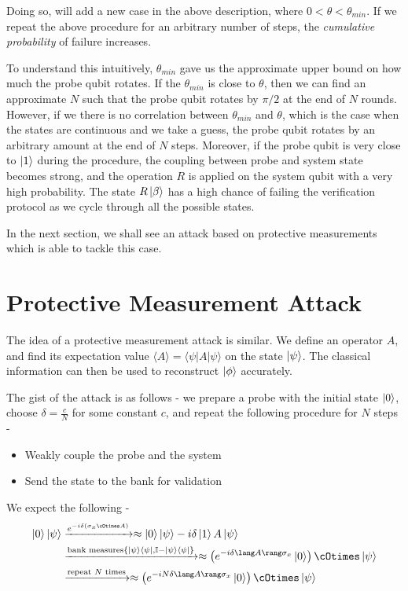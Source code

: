 \documentclass[]{article}
\newcommand*{\E}[1]{\langle #1 \rangle}
\begin{document}
Doing so, will add a new case in the above description, where $0 < \theta < \theta_{min}$. If we repeat the above procedure for an arbitrary number of steps, the \textit{cumulative probability} of failure increases. 

To understand this intuitively, $\theta_{min}$ gave us the approximate upper bound on how much the probe qubit rotates. If the $\theta_{min}$ is close to $\theta$, then we can find an approximate $N$ such that the probe qubit rotates by $\pi/2$ at the end of $N$ rounds. However, if we there is no correlation between $\theta_{min}$ and $\theta$, which is the case when the states are continuous and we take a guess, the probe qubit rotates by an arbitrary amount at the end of $N$ steps. Moreover, if the probe qubit is very close to $\ket{1}$ during the procedure, the coupling between probe and system state becomes strong, and the operation $R$ is applied on the system qubit with a very high probability. The state $R\ket{\beta}$ has a high chance of failing the verification protocol as we cycle through all the possible states.

In the next section, we shall see an attack based on protective measurements which is able to tackle this case.
\clearpage
\section{Protective Measurement Attack}
The idea of a protective measurement attack is similar. We define an operator $A$, and find its expectation value $\E{A} = \langle \psi \vert A \vert \psi \rangle$ on the state $\ket{\psi}$. The classical information can then be used to reconstruct $\ket{\phi}$ accurately.

The gist of the attack is as follows - we prepare a probe with the initial state $\ket{0}$, choose $\delta = \frac{c}{N}$ for some constant $c$, and repeat the following procedure for $N$ steps -

\begin{itemize}
    \item Weakly couple the probe and the system
    \item Send the state to the bank for validation
\end{itemize}

We expect the following -
\begin{align}
        \ket{0}\ket{\psi} & \xrightarrow{e^{-i\delta (\sigma_x \cOtimes A)}} \approx \ket{0}\ket{\psi} - i\delta \ket{1}A\ket{\psi} \\
        &\xrightarrow{\text{bank measures} \{\ket{\psi}\bra{\psi}, \mathbb I - \ket{\psi}\bra{\psi}\}} \approx \left(e^{-i \delta \lang A \rang \sigma_x} \ket{0}\right) \cOtimes \ket{\psi} \\
        &\xrightarrow{\text{repeat } N \text{ times}} \approx \left(e^{-i N\delta \lang A \rang \sigma_x} \ket{0}\right) \cOtimes \ket{\psi} 
\end{align}
\end{document}
